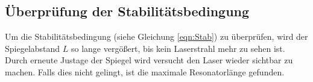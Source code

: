 \subsection{Überprüfung der Stabilitätsbedingung}
Um die Stabilitätsbedingung (siehe Gleichung \eqref{eqn:Stab}) zu überprüfen, wird der Spiegelabstand $L$ so lange vergößert, bis kein Laserstrahl mehr zu sehen ist. Durch erneute Justage der Spiegel wird versucht den Laser wieder sichtbar zu machen. Falls dies nicht gelingt, ist die maximale Resonatorlänge gefunden.
